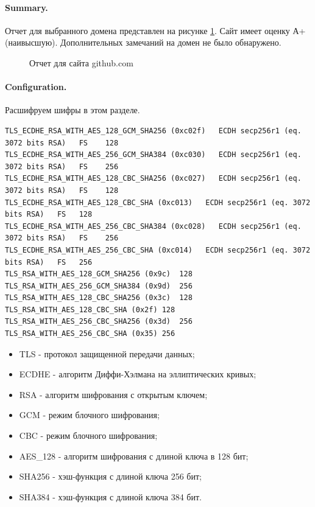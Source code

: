 \documentclass[10pt,a4paper]{report}
\begin{document}
\paragraph{Summary.}Отчет для выбранного домена представлен на рисунке \ref{ris:img3}. Сайт имеет оценку А+ (наивысшую). Дополнительных замечаний на домен не было обнаружено. \\
\begin{figure}[ht]	
\caption{Отчет для сайта github.com}
\label{ris:img3}
\end{figure}
\paragraph{Configuration.}Расшифруем шифры в этом разделе.
\begin{verbatim}
TLS_ECDHE_RSA_WITH_AES_128_GCM_SHA256 (0xc02f)   ECDH secp256r1 (eq. 3072 bits RSA)   FS	128
TLS_ECDHE_RSA_WITH_AES_256_GCM_SHA384 (0xc030)   ECDH secp256r1 (eq. 3072 bits RSA)   FS	256
TLS_ECDHE_RSA_WITH_AES_128_CBC_SHA256 (0xc027)   ECDH secp256r1 (eq. 3072 bits RSA)   FS	128
TLS_ECDHE_RSA_WITH_AES_128_CBC_SHA (0xc013)   ECDH secp256r1 (eq. 3072 bits RSA)   FS	128
TLS_ECDHE_RSA_WITH_AES_256_CBC_SHA384 (0xc028)   ECDH secp256r1 (eq. 3072 bits RSA)   FS	256
TLS_ECDHE_RSA_WITH_AES_256_CBC_SHA (0xc014)   ECDH secp256r1 (eq. 3072 bits RSA)   FS	256
TLS_RSA_WITH_AES_128_GCM_SHA256 (0x9c)	128
TLS_RSA_WITH_AES_256_GCM_SHA384 (0x9d)	256
TLS_RSA_WITH_AES_128_CBC_SHA256 (0x3c)	128
TLS_RSA_WITH_AES_128_CBC_SHA (0x2f)	128
TLS_RSA_WITH_AES_256_CBC_SHA256 (0x3d)	256
TLS_RSA_WITH_AES_256_CBC_SHA (0x35)	256
\end{verbatim}
\begin{itemize}
\item TLS - протокол защищенной передачи данных;
\item ECDHE - алгоритм Диффи-Хэлмана на эллиптических кривых;
\item RSA - алгоритм шифрования с открытым ключем;
\item GCM - режим блочного шифрования;
\item CBC - режим блочного шифрования;
\item AES\_128 - алгоритм шифрования с длиной ключа в 128 бит;
\item SHA256 - хэш-функция с длиной ключа 256 бит;
\item SHA384 - хэш-функция с длиной ключа 384 бит.
\end{itemize}
\end{document}
